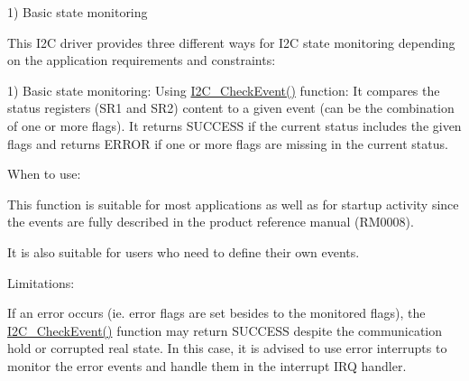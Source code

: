 1) Basic state monitoring

This I2C driver provides three different ways for I2C state monitoring depending on the application requirements and constraints\+:

1) Basic state monitoring\+: Using \hyperlink{agilefox_2library_2src_2stm32f10x__i2c_8c_a7a2dae90ca87dd8b95fee3fb675a7bd3}{I2\+C\+\_\+\+Check\+Event()} function\+: It compares the status registers (S\+R1 and S\+R2) content to a given event (can be the combination of one or more flags). It returns S\+U\+C\+C\+E\+SS if the current status includes the given flags and returns E\+R\+R\+OR if one or more flags are missing in the current status.
\begin{DoxyItemize}
\item When to use\+:
\begin{DoxyItemize}
\item This function is suitable for most applications as well as for startup activity since the events are fully described in the product reference manual (R\+M0008).
\item It is also suitable for users who need to define their own events.
\end{DoxyItemize}
\item Limitations\+:
\begin{DoxyItemize}
\item If an error occurs (ie. error flags are set besides to the monitored flags), the \hyperlink{agilefox_2library_2src_2stm32f10x__i2c_8c_a7a2dae90ca87dd8b95fee3fb675a7bd3}{I2\+C\+\_\+\+Check\+Event()} function may return S\+U\+C\+C\+E\+SS despite the communication hold or corrupted real state. In this case, it is advised to use error interrupts to monitor the error events and handle them in the interrupt I\+RQ handler.


\end{DoxyItemize}
\end{DoxyItemize}
